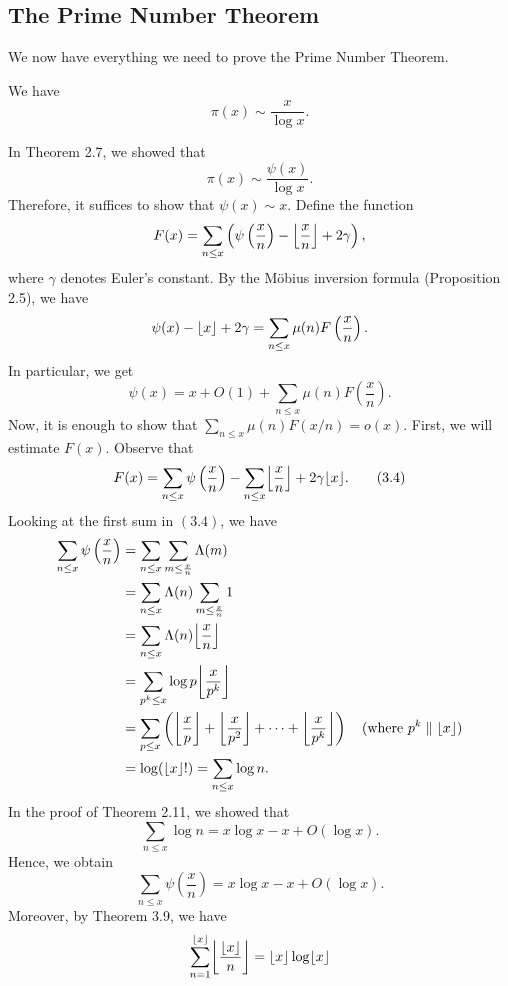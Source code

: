 \subsection{The Prime Number Theorem}
We now have everything we need to prove the Prime Number Theorem. 

\begin{thm} 
    We have 
    \[ \pi(x) \sim \frac{x}{\log x}. \] 
\end{thm}
\begin{pf}
    In Theorem 2.7, we showed that 
    \[ \pi(x) \sim \frac{\psi(x)}{\log x}. \] 
    Therefore, it suffices to show that $\psi(x) \sim x$. Define the function 
    \[ F(x) = \sum_{n\leq x} \left( \psi\left( \frac xn \right) - \floor*{\frac xn}
    + 2\gamma \right), \] 
    where $\gamma$ denotes Euler's constant. By the M\"obius inversion formula 
    (Proposition 2.5), we have 
    \[ \psi(x) - \floor{x} + 2\gamma = \sum_{n\leq x} \mu(n) F\left( \frac xn \right). \] 
    In particular, we get 
    \[ \psi(x) = x + O(1) + \sum_{n \leq x} \mu(n) F\left( \frac xn \right). \] 
    Now, it is enough to show that $\sum_{n\leq x} \mu(n) F(x/n) = o(x)$. First, 
    we will estimate $F(x)$. Observe that 
    \[ F(x) = \sum_{n\leq x} \psi\left( \frac xn \right) - \sum_{n \leq x} 
    \floor*{\frac xn} + 2\gamma\floor{x}. \tag{3.4} \]
    Looking at the first sum in $(3.4)$, we have 
    \begin{align*}
        \sum_{n\leq x} \psi\left( \frac xn \right) 
        &= \sum_{n \leq x} \sum_{m \leq \frac xn} \Lambda(m) \\
        &= \sum_{n \leq x} \Lambda(n) \sum_{m\leq \frac xn} 1 \\
        &= \sum_{n \leq x} \Lambda(n) \floor*{\frac xn} \\
        &= \sum_{p^k \leq x} \log p \floor*{\frac x{p^k}} \\ 
        &= \sum_{p \leq x} \left( \floor*{\frac xp} + \floor*{\frac x{p^2}} 
        + \cdots + \floor*{\frac x{p^k}} \right) \quad \text{(where $p^k\;\|\;\floor{x}$)} \\
        &= \log(\floor{x}!) = \sum_{n \leq x} \log n. 
    \end{align*}
    In the proof of Theorem 2.11, we showed that 
    \[ \sum_{n\leq x} \log n = x\log x - x + O(\log x). \] 
    Hence, we obtain 
    \[ \sum_{n\leq x} \psi\left( \frac xn \right) = x\log x - x + O(\log x). \tag{3.5} \] 
    Moreover, by Theorem 3.9, we have 
    \[ \sum_{n=1}^{\floor{x}} \floor*{\frac{\floor x}n} = \floor{x}\log\floor{x} 
\]
\end{pf}
